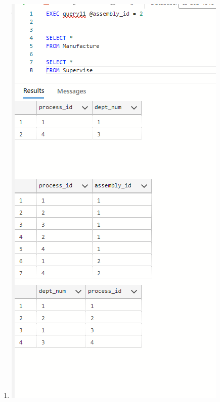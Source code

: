 \documentclass[11pt]{article}
\begin{document}
\begin{enumerate}
\item%

\includegraphics[width = \textwidth]{assembly1.png}


\end{enumerate}
\end{document}
